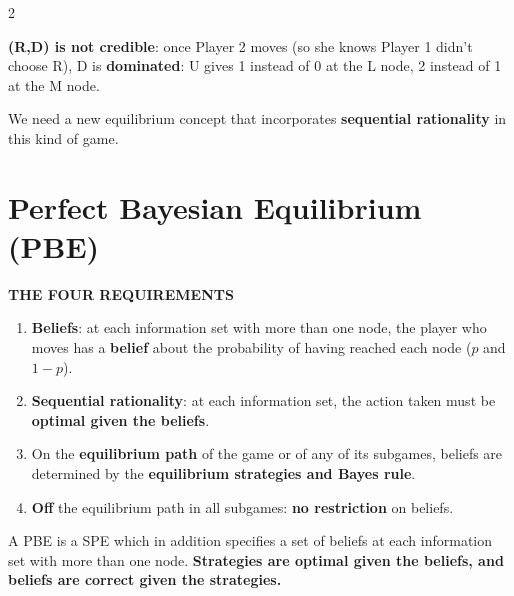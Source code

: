 \documentclass[a4paper,9pt]{extarticle}
\begin{document}
\begin{multicols}{2}
\begin{itemize}
\end{itemize}


\begin{warning}

\textbf{(R,D) is not credible}: once Player 2 moves (so she knows Player 1 didn't choose R),
D is \textbf{dominated}: U gives 1 instead of 0 at the L node, 2 instead of 1 at the M node.

We need a new equilibrium concept that incorporates \textbf{sequential rationality} in this
kind of game.

\end{warning}



\section{Perfect Bayesian Equilibrium (PBE)}


\begin{definition}

\textbf{THE FOUR REQUIREMENTS}

\begin{enumerate}

\item \textbf{Beliefs}: at each information set with more than one node, the player who moves
has a \textbf{belief} about the probability of having reached each node ($p$ and $1-p$).

\item \textbf{Sequential rationality}: at each information set, the action taken must be
\textbf{optimal given the beliefs}.

\item On the \textbf{equilibrium path} of the game or of any of its subgames, beliefs are
determined by the \textbf{equilibrium strategies and Bayes rule}.

\item \textbf{Off} the equilibrium path in all subgames: \textbf{no restriction} on beliefs.

\end{enumerate}

\end{definition}


\begin{important}

A PBE is a SPE which in addition specifies a set of beliefs at each information set with more
than one node. \textbf{Strategies are optimal given the beliefs, and beliefs are correct given
the strategies.}


\end{important}
\end{multicols}
\end{document}
